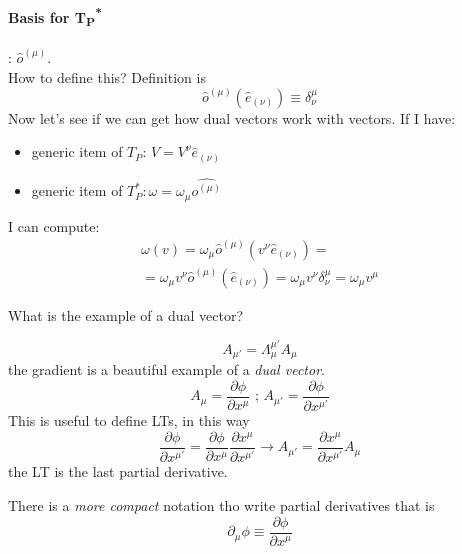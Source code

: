 \paragraph{Basis for T\textsubscript{P}\textsuperscript{*}}: $\hat{o}^{\left( \mu  \right)}$. \\
How to define this? Definition is
\[
\hat{o}^{\left( \mu  \right)}\left( \hat{e}_{\left( \nu  \right)} \right) \equiv \delta^{\mu }_{\nu }
\]
Now let's see if we can get how dual vectors work with vectors.
If I have:
\begin{itemize}
	\item generic item of $T_{P}$: $V = V^{\nu }\hat{e}_{\left( \nu  \right)}$
	\item generic item of $T_{P}^{*}: \omega = \omega_{\mu }\hat{o^{\left( \mu  \right)}}$ 
\end{itemize} 

I can compute:
\begin{gather*}
\omega \left( v \right) = \omega_{\mu }\hat{o}^{\left( \mu  \right)}\left( v^{\nu }\hat{e}_{\left( \nu  \right)} \right) =  \\
= \omega_{\mu }v^{\nu }\hat{o}^{\left( \mu  \right)}\left( \hat{e}_{\left( \nu  \right)} \right) = \omega_{\mu } v^{\nu } \delta^{\mu}_{\nu } = \omega_{\mu }v^{\mu }
\end{gather*}

\noindent{} \par

What is the example of a dual vector? \par
\[
A_{\mu '} = \Lambda_{\mu }^{\mu '} A_{\mu }
\]
the gradient is a beautiful example of a \emph{dual vector}.
\[
A_{\mu } = \frac{\partial\phi }{\partial x^{\mu }} \text{  ;   } A_{\mu '} = \frac{\partial\phi }{\partial x^{\mu '}}
\]
This is useful to define LTs, in this way
\[
\frac{\partial\phi }{\partial x^{\mu '}} = \frac{\partial\phi }{\partial x^{\mu }} \frac{\partial x^{\mu }}{\partial x^{\mu '}} \to A_{\mu '} = \frac{\partial x^{\mu }}{\partial x^{\mu '}}A_{\mu }
\]
the LT is the last partial derivative. \par

There is a \emph{more compact} notation tho write partial derivatives that is
\[
\partial_{\mu } \phi \equiv \frac{\partial\phi }{\partial x^{\mu }}
\]

